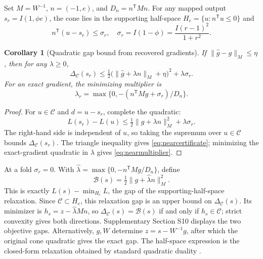 \documentclass[10pt,a4paper]{article}
\newtheorem{corollary}[theorem]{Corollary}
\begin{document}
Set $M=W^{-1}$, $n=(-1,e)$, and $D_n=n^{\mathsf T}Mn$. For any mapped output $s_r=I(1,\phi e)$, the cone lies in the supporting half-space $H_e=\{u:n^{\mathsf T}u\leq0\}$ and
\begin{equation}
 n^{\mathsf T}(u-s_r)\leq\sigma_r,\quad
 \sigma_r=I(1-\phi)=\frac{I(r-1)^2}{1+r^2}.
 \label{eq:supportslack}
\end{equation}
\begin{corollary}[Quadratic gap bound from recovered gradients]
\label{cor:gap}
If $\|\widehat g-g\|_M\leq\eta$, then for any $\lambda\geq0$,
\begin{equation}
 \Delta_{\mathcal C}(s_r)\leq
 \tfrac12\bigl(\|\widehat g+\lambda n\|_M+\eta\bigr)^2
 +\lambda\sigma_r.
 \label{eq:nearcertificate}
\end{equation}
For an exact gradient, the minimizing multiplier is
\begin{equation}
 \lambda_r=\max\{0,-(n^{\mathsf T}Mg+\sigma_r)/D_n\}.
 \label{eq:nearmultiplier}
\end{equation}
\end{corollary}
\begin{proof}
For $u\in\mathcal C$ and $d=u-s_r$, complete the quadratic:
\begin{equation*}
 L(s_r)-L(u)\leq\tfrac12\|g+\lambda n\|_M^2+\lambda\sigma_r.
\end{equation*}
The right-hand side is independent of $u$, so taking the supremum over $u\in\mathcal C$ bounds $\Delta_{\mathcal C}(s_r)$. The triangle inequality gives \eqref{eq:nearcertificate}; minimizing the exact-gradient quadratic in $\lambda$ gives \eqref{eq:nearmultiplier}.
\end{proof}
At a fold $\sigma_r=0$. With $\widehat\lambda=\max\{0,-n^{\mathsf T}Mg/D_n\}$, define
\begin{equation}
 \mathcal B(s)=\tfrac12\|g+\widehat\lambda n\|_M^2.
 \label{eq:residualcertificate}
\end{equation}
This is exactly $L(s)-\min_{H_e}L$, the gap of the supporting-half-space relaxation. Since $\mathcal C\subset H_e$, this relaxation gap is an upper bound on $\Delta_{\mathcal C}(s)$. Its minimizer is $h_s=z-\widehat\lambda Mn$, so $\Delta_{\mathcal C}(s)=\mathcal B(s)$ if and only if $h_s\in\mathcal C$; strict convexity gives both directions. Supplementary Section S10 displays the two objective gaps. Alternatively, $g,W$ determine $z=s-W^{-1}g$, after which the original cone quadratic gives the exact gap. The half-space expression is the closed-form relaxation obtained by standard quadratic duality \cite{cvxbook}.
\end{document}
